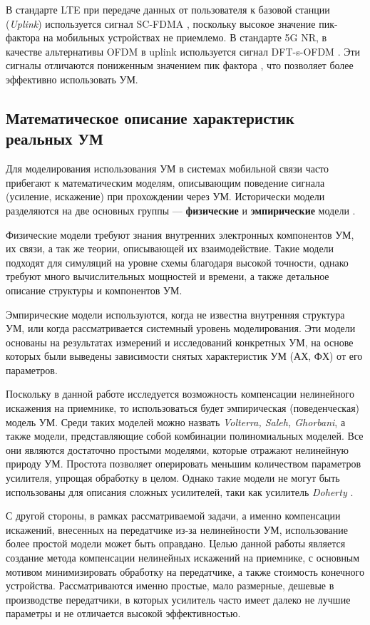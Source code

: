 В стандарте LTE при передаче данных от пользователя к базовой станции
(\textit{Uplink}) используется сигнал SC-FDMA \cite{3gpp.36.211}, поскольку
высокое значение пик-фактора на мобильных устройствах не приемлемо. В
стандарте 5G NR, в качестве альтернативы OFDM в uplink используется сигнал
DFT-s-OFDM \cite{3gpp.38.300}. Эти сигналы отличаются пониженным значением
пик фактора \cite{Vaigandla2021}, что позволяет более эффективно
использовать УМ.


\subsection{Математическое описание характеристик реальных УМ}

Для моделирования использования УМ в системах мобильной связи часто прибегают к
математическим моделям, описывающим поведение сигнала (усиление, искажение) при 
прохождении через УМ. Исторически модели разделяются на две основных
группы — \textbf{физические} и \textbf{эмпирические} модели \cite{cambridge2008}.

Физические модели требуют знания внутренних электронных компонентов УМ, их
связи, а так же теории, описывающей их взаимодействие. Такие модели подходят
для симуляций на уровне схемы благодаря высокой точности, однако требуют
много вычислительных мощностей и времени, а также детальное описание
структуры и компонентов УМ.

Эмпирические модели используются, когда не известна внутренняя структура УМ,
или когда рассматривается системный уровень моделирования. Эти модели
основаны на результатах измерений и исследований конкретных УМ, на основе
которых были выведены зависимости снятых характеристик УМ (АХ, ФХ) от его
параметров.

Поскольку в данной работе исследуется возможность компенсации нелинейного
искажения на приемнике, то использоваться будет эмпирическая
(поведенческая) модель УМ. Среди таких моделей можно назвать
\textit{Volterra, Saleh, Ghorbani}, а также модели, представляющие собой комбинации
полиномиальных моделей. Все они являются достаточно простыми моделями,
которые отражают нелинейную природу УМ. Простота позволяет оперировать
меньшим количеством параметров усилителя, упрощая обработку в целом. Однако
такие модели не могут быть использованы для описания сложных усилителей,
таки как усилитель \textit{Doherty} \cite{Doherty1936}\cite{3gpp.38.803}.

С другой стороны, в рамках рассматриваемой задачи, а именно компенсации
искажений, внесенных на передатчике из-за нелинейности УМ, использование
более простой модели может быть оправдано. Целью данной работы является
создание метода компенсации нелинейных искажений на приемнике, с основным
мотивом минимизировать обработку на передатчике, а также стоимость
конечного устройства. Рассматриваются именно простые, мало размерные,
дешевые в производстве передатчики, в которых усилитель часто имеет далеко
не лучшие параметры и не отличается высокой эффективностью.

